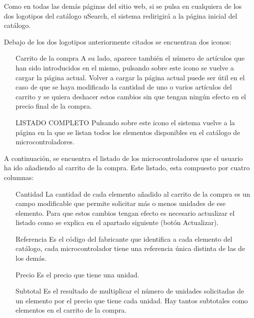 Como en todas las demás páginas del sitio web, si se pulsa en cualquiera de los dos logotipos del catálogo uSearch,
el sistema redirigirá a la página inicial del catálogo.

Debajo de los dos logotipos anteriormente citados se encuentran dos iconos:
\begin{itemize}
	\item[Carrito de la compra] A su lado, aparece también el número de artículos 
	que han sido introducidos en el mismo, pulsando sobre este icono se vuelve a cargar la página actual. Volver a 				
  cargar la página actual puede ser útil en el caso de que se haya modificado la cantidad de uno o varios artículos 			
  del	carrito y se quiera deshacer estos cambios sin que tengan ningún efecto en el precio final de la compra.

	\item[LISTADO COMPLETO] Pulsando sobre este icono el sistema vuelve a la página en la que se listan todos los
	elementos disponibles en el catálogo de microcontroladores.
\end{itemize}

A continuación, se encuentra el listado de los microcontroladores que el usuario ha ido añadiendo al carrito de la 
compra. Este listado, esta compuesto por cuatro columnas: 
\begin{itemize}
	\item[Cantidad] La cantidad de cada elemento añadido al carrito de la compra es un campo modificable que permite
	solicitar más o menos unidades de ese elemento. Para que estos cambios tengan efecto es necesario actualizar el 
	listado como se explica en el apartado siguiente (botón Actualizar).
	
	\item[Referencia] Es el código del fabricante que identifica a cada elemento del catálogo, cada microcontrolador
	tiene una referencia única distinta de las de los demás.
	
	\item[Precio] Es el precio que tiene una unidad.

	\item[Subtotal] Es el resultado de multiplicar el número de unidades solicitadas de un elemento por el precio que
	tiene cada unidad. Hay tantos subtotales como elementos en el carrito de la compra.
\end{itemize}


